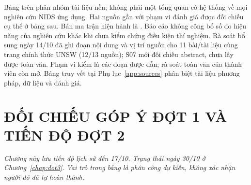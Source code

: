 \documentclass[12pt,a4paper,oneside]{report}
\begin{document}
Bảng trên phân nhóm tài liệu nền; không phải một tổng quan có hệ thống về mọi nghiên cứu NIDS ứng dụng. Hai nguồn gần với phạm vi đánh giá được đối chiếu cụ thể ở bảng sau. Bản ma trận hiện hành là . Báo cáo không công bố số đo hiệu năng của nghiên cứu khác khi chưa kiểm chứng điều kiện thí nghiệm. Rà soát bổ sung ngày 14/10 đã ghi đoạn nội dung và vị trí nguồn cho 11 bài/tài liệu cùng trang chính thức UNSW (12/13 nguồn); S07 mới đối chiếu abstract, chưa lấy được toàn văn. Phạm vi kiểm là các đoạn được dẫn; rà soát toàn văn của thành viên còn mở. Bảng truy vết tại Phụ lục~\ref{app:sources} phân biệt tài liệu phương pháp, dữ liệu và đánh giá.



\chapter{ĐỐI CHIẾU GÓP Ý ĐỢT 1 VÀ TIẾN ĐỘ ĐỢT 2}
\noindent\textit{Chương này lưu tiến độ lịch sử đến 17/10. Trạng thái ngày 30/10 ở Chương~\ref{chap:dot3}. Vai trò trong bảng là phân công dự kiến, không xác nhận người đó đã tự hoàn thành.}\par
\end{document}
